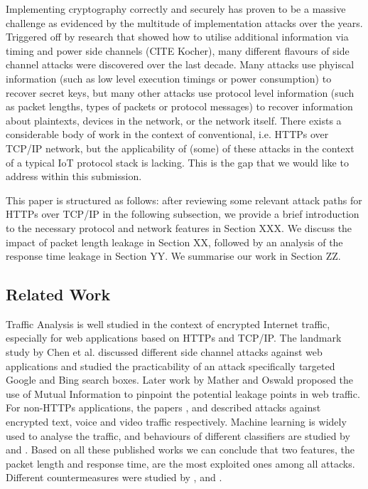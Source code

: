 \documentclass{article}
\begin{document}
Implementing cryptography correctly and securely has proven to be a massive challenge as evidenced by the multitude of implementation attacks over the years. Triggered off by research that showed how to utilise additional information via timing and power side channels (CITE Kocher), many different flavours of side channel attacks were discovered over the last decade. Many attacks use phyiscal information (such as low level execution timings or power consumption) to recover secret keys, but many other attacks use protocol level information (such as packet lengths, types of packets or protocol messages) to recover information about plaintexts, devices in the network, or the network itself. 
There exists a considerable body of work in the context of conventional, i.e. HTTPs over TCP/IP network, but the applicability of (some) of these attacks in the context of a typical IoT protocol stack is lacking. This is the gap that we would like to address within this submission. 

This paper is structured as follows: after reviewing some relevant attack paths for HTTPs over TCP/IP in the following subsection, we provide a brief introduction to the necessary protocol and network features in Section XXX.  We discuss the impact of packet length leakage in Section XX, followed by an analysis of the response time leakage in Section YY. We summarise our work in Section ZZ. 

\subsection{Related Work}

Traffic Analysis is well studied in the context of encrypted Internet traffic, especially for web applications based on HTTPs and TCP/IP. The landmark study by Chen et al. \cite{WebSidechannel} discussed different side channel attacks against web applications and \cite{SuggestBox} studied the practicability of an attack specifically targeted Google and Bing search boxes. Later work by Mather and Oswald \cite{PinpointWeb} proposed the use of Mutual Information to pinpoint the potential leakage points in web traffic. For non-HTTPs applications, the papers \cite{AppleMsg}, \cite{Language} and \cite{VideoTraffic} described attacks against encrypted text, voice and video traffic respectively. Machine learning is widely used to analyse the traffic, and behaviours of different classifiers are studied by \cite{HClassifier} and \cite{Peekaboo}. Based on all these published works we can conclude that two features, the packet length and response time, are the most exploited ones among all attacks. Different countermeasures were studied by \cite{TrafficMorphing}, \cite{HTTPOS} and \cite{FTE}.
\end{document}

